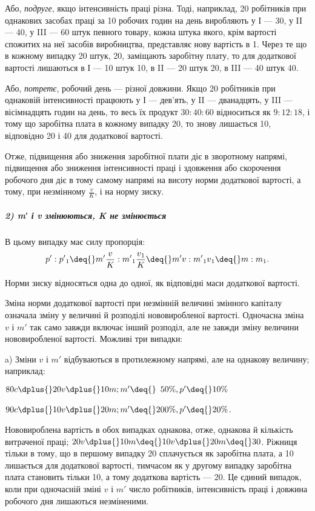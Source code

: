 Або, \emph{подруге}, якщо інтенсивність праці різна. Тоді, наприклад,
20 робітників при однакових засобах праці за 10 робочих
годин на день виробляють у І — 30, у II — 40, у III — 60 штук
певного товару, кожна штука якого, крім вартості спожитих
на неї засобів виробництва, представляє нову вартість в 1. Через те що в кожному випадку 20 штук, \deq{} 20, заміщають заробітну плату, то для додаткової
вартості лишаються в І — 10 штук \deq{} 10,
в II — 20 штук \deq{} 20, в III — 40 штук \deq{} 40.

Або, \emph{потретє}, робочий день — різної довжини. Якщо 20 робітників
при однаковій інтенсивності працюють у І — дев’ять,
у II — дванадцять, у III — вісімнадцять годин на день, то весь їх
продукт $30 : 40 : 60$ відноситься як $9 : 12 : 18$, і тому що заробітна
плата в кожному випадку \deq{} 20, то знову лишається 10, відповідно
20 і 40 для додаткової вартості.

Отже, підвищення або зниження заробітної плати діє в зворотному
напрямі, підвищення або зниження інтенсивності праці
і здовження або скорочення робочого дня діє в тому самому
напрямі на висоту норми додаткової вартості, а тому, при незмінному
$\frac{v}{K}$, і на норму зиску.

\subparagraph*{2) m′ і v змінюються, K не змінюється}
В цьому випадку має силу пропорція:\[
p': p'\textsubscript{1} \deq{} m' \frac{v}{K} : m'\textsubscript{1} \frac{v\textsubscript{1}}{K} \deq{} m'v : m'\textsubscript{1}v\textsubscript{1} \deq{} m : m\textsubscript{1}.\]

Норми зиску відносяться одна до одної, як відповідні маси
додаткової вартості.

Зміна норми додаткової вартості при незмінній величині змінного
капіталу означала зміну у величині й розподілі нововиробленої
вартості. Одночасна зміна $v$ і $m'$ так само завжди включає
інший розподіл, але не завжди зміну величини нововиробленої
вартості. Можливі три випадки:

a) Зміни $v$ і $m'$ відбуваються в протилежному напрямі, але
на однакову величину; наприклад:
\begin{center}
$80 c \dplus{} 20 v \dplus{} 10 m; m' \deq{} \phantom{0}50\%, p' \deq{} 10\%$

$90 c \dplus{} 10 v \dplus{} 20 m; m' \deq{} 200\%, p' \deq{} 20\%$.
\end{center}
Нововироблена вартість в обох випадках однакова, отже, однакова
й кількість витраченої праці; $20 v \dplus{} 10 m \deq{} 10 v \dplus{} 20 m \deq{} 30$.
Ріжниця тільки в тому, що в першому випадку 20 сплачується
як заробітна плата, а 10 лишається для додаткової вартості,
тимчасом як у другому випадку заробітна плата становить
тільки 10, а тому додаткова вартість — 20. Це єдиний випадок,
коли при одночасній зміні $v$ і $m'$ число робітників, інтенсивність
праці і довжина робочого дня лишаються незміненими.

